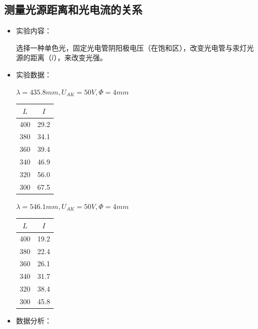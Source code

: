 \documentclass[a4paper]{ltxdoc}
\newenvironment{Figure}
  {\par\medskip\noindent\minipage{\linewidth}}
  {\endminipage\par\medskip}
\begin{document}
\begin{multicols}{2}
    \subsection{测量光源距离和光电流的关系}
    \begin{itemize}
        \item 实验内容：

              选择一种单色光，固定光电管阴阳极电压（在饱和区），改变光电管与汞灯光源的距离（$l$），来改变光强。

        \item 实验数据：

              \smallskip
              \begin{Figure}
                  \centering
                  $\lambda = 435.8 mm,U_{AK} = 50 V, \Phi = 4mm$

                  \smallskip
                  \begin{tabular}{|c|c|}
                      \hline $L$ & $I$  \\
                      \hline 400 & 29.2 \\
                      \hline 380 & 34.1 \\
                      \hline 360 & 39.4 \\
                      \hline 340 & 46.9 \\
                      \hline 320 & 56.0 \\
                      \hline 300 & 67.5 \\
                      \hline
                  \end{tabular}
              \end{Figure}
              \begin{Figure}
                  \centering
                  $\lambda = 546.1 mm,U_{AK} = 50 V, \Phi = 4mm$

                  \smallskip
                  \begin{tabular}{|c|c|}
                      \hline $L$ & $I$  \\
                      \hline 400 & 19.2 \\
                      \hline 380 & 22.4 \\
                      \hline 360 & 26.1 \\
                      \hline 340 & 31.7 \\
                      \hline 320 & 38.4 \\
                      \hline 300 & 45.8 \\
                      \hline
                  \end{tabular}
              \end{Figure}
        \item 数据分析：


\end{itemize}
\end{multicols}
\end{document}
